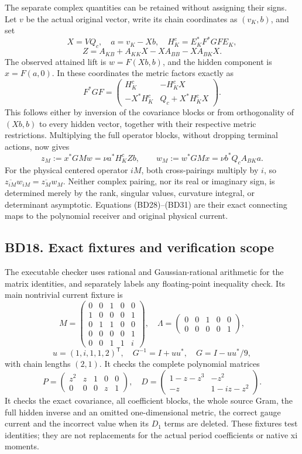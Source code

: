 \documentclass[11pt]{article}
\begin{document}
The separate complex quantities can be retained without assigning their signs. Let \(v\) be the actual original vector, write its chain coordinates as \((v_K,b)\), and set \[
X=VQ_c,\quad a=v_K-Xb,\quad H_K^c=E_K^*F^*GF E_K,
\] \[
Z=A_{KB}+A_{KK}X-XA_{BB}-XA_{BK}X.
\] The observed attained lift is \(w=F(Xb,b)\), and the hidden component is \(x=F(a,0)\). In these coordinates the metric factors exactly as \[
F^*GF=
\begin{pmatrix}H_K^c&-H_K^cX\\-X^*H_K^c&Q_c+X^*H_K^cX\end{pmatrix}.
\] This follows either by inversion of the covariance blocks or from orthogonality of \((Xb,b)\) to every hidden vector, together with their respective metric restrictions. Multiplying the full operator blocks, without dropping terminal actions, now gives \[
z_M:=x^*GMw=\nu a^*H_K^c Zb,\qquad
w_M:=w^*GMx=\nu b^*Q_cA_{BK}a. \tag{BD31}
\] For the physical centered operator \(iM\), both cross-pairings multiply by \(i\), so \(\overline{z_{iM}}w_{iM}=\overline{z_M}w_M\). Neither complex pairing, nor its real or imaginary sign, is determined merely by the rank, singular values, curvature integral, or determinant asymptotic. Equations (BD28)--(BD31) are their exact connecting maps to the polynomial receiver and original physical current.

\subsection{BD18. Exact fixtures and verification scope}\label{bd18.-exact-fixtures-and-verification-scope}

The executable checker uses rational and Gaussian-rational arithmetic for the matrix identities, and separately labels any floating-point inequality check. Its main nontrivial current fixture is \[
M=\begin{pmatrix}0&0&1&0&0\\1&0&0&0&1\\0&1&1&0&0\\0&0&0&0&1\\0&0&1&1&i\end{pmatrix},\quad
\Lambda=\begin{pmatrix}0&0&1&0&0\\0&0&0&0&1\end{pmatrix},
\] \[
u=(1,i,1,1,2)^{\mathsf T},\quad G^{-1}=I+uu^*,\quad G=I-uu^*/9,
\] with chain lengths \((2,1)\). It checks the complete polynomial matrices \[
P=\begin{pmatrix}z^2&z&1&0&0\\0&0&0&z&1\end{pmatrix},\quad
D=\begin{pmatrix}1-z-z^3&-z^2\\-z&1-iz-z^2\end{pmatrix}.
\] It checks the exact covariance, all coefficient blocks, the whole source Gram, the full hidden inverse and an omitted one-dimensional metric, the correct gauge current and the incorrect value when its \(D_1\) terms are deleted. These fixtures test identities; they are not replacements for the actual period coefficients or native xi moments.
\end{document}
